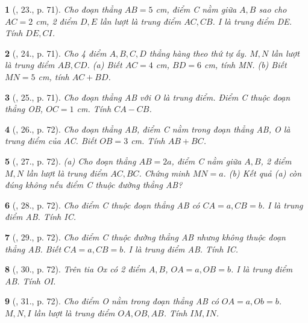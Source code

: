 \documentclass{article}
\newtheorem{baitoan}{}
\begin{document}
\begin{baitoan}[\cite{Binh_Toan_6_tap_2}, 23., p. 71]
	Cho đoạn thẳng $AB = 5$ {\rm cm}, điểm C nằm giữa $A,B$ sao cho $AC = 2$ {\rm cm}, 2 điểm $D,E$ lần lượt là trung điểm $AC,CB$. I là trung điểm DE. Tính  $DE,CI$.
\end{baitoan}

\begin{baitoan}[\cite{Binh_Toan_6_tap_2}, 24., p. 71]
	Cho 4 điểm $A,B,C,D$ thẳng hàng theo thứ tự ấy. $M,N$ lần lượt là trung điểm $AB,CD$. (a) Biết $AC = 4$ {\rm cm}, $BD = 6$ {\rm cm}, tính MN. (b) Biết $MN = 5$ {\rm cm}, tính $AC + BD$.
\end{baitoan}

\begin{baitoan}[\cite{Binh_Toan_6_tap_2}, 25., p. 71]
	Cho đoạn thẳng AB với O là trung điểm. Điểm C thuộc đoạn thẳng OB, $OC = 1$ {\rm cm}. Tính $CA - CB$.
\end{baitoan}

\begin{baitoan}[\cite{Binh_Toan_6_tap_2}, 26., p. 72]
	Cho đoạn thẳng AB, điểm C nằm trong đoạn thẳng AB, O là trung điểm của AC. Biết $OB = 3$ {\rm cm}. Tính $AB + BC$.
\end{baitoan}

\begin{baitoan}[\cite{Binh_Toan_6_tap_2}, 27., p. 72]
	(a) Cho đoạn thẳng $AB = 2a$, điểm C nằm giữa $A,B$, 2 điểm $M,N$ lần lượt là trung điểm $AC,BC$. Chứng minh $MN = a$. (b) Kết quả (a) còn đúng không nếu điểm C thuộc đường thẳng AB?
\end{baitoan}

\begin{baitoan}[\cite{Binh_Toan_6_tap_2}, 28., p. 72]
	Cho điểm C thuộc đoạn thẳng AB có $CA = a,CB = b$. I là trung điểm AB. Tính IC.
\end{baitoan}

\begin{baitoan}[\cite{Binh_Toan_6_tap_2}, 29., p. 72]
	Cho điểm C thuộc đường thẳng AB nhưng không thuộc đoạn thẳng AB. Biết $CA = a,CB = b$. I là trung điểm AB. Tính IC.
\end{baitoan}

\begin{baitoan}[\cite{Binh_Toan_6_tap_2}, 30., p. 72]
	Trên tia Ox có 2 điểm $A,B$, $OA = a,OB = b$. I là trung điểm AB. Tính OI.
\end{baitoan}

\begin{baitoan}[\cite{Binh_Toan_6_tap_2}, 31., p. 72]
	Cho điểm O nằm trong đoạn thẳng AB có $OA = a,Ob = b$. $M,N,I$ lần lượt là trung điểm $OA,OB,AB$. Tính $IM,IN$.
\end{baitoan}
\end{document}
